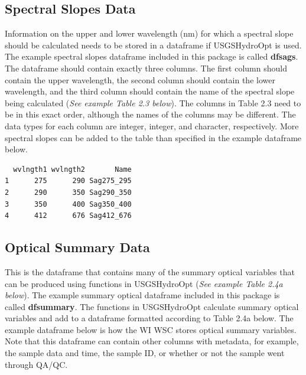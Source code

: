 \documentclass[a4paper,11pt]{article}\usepackage[]{graphicx}\usepackage[]{color}
\makeatletter
\newenvironment{kframe}{%
 \def\at@end@of@kframe{}%
 \ifinner\ifhmode%
  \def\at@end@of@kframe{\end{minipage}}%
  \begin{minipage}{\columnwidth}%
 \fi\fi%
 \def\FrameCommand##1{\hskip\@totalleftmargin \hskip-\fboxsep
 \colorbox{shadecolor}{##1}\hskip-\fboxsep
     \hskip-\linewidth \hskip-\@totalleftmargin \hskip\columnwidth}%
 \MakeFramed {\advance\hsize-\width
   \@totalleftmargin\z@ \linewidth\hsize
   \@setminipage}}%
 {\par\unskip\endMakeFramed%
 \at@end@of@kframe}
\newenvironment{knitrout}{}{} %
\makeatother
\begin{document}
\subsection{Spectral Slopes Data}
Information on the upper and lower wavelength (nm) for which a spectral slope should be calculated needs to be stored in a dataframe if USGSHydroOpt is used. The example spectral slopes dataframe included in this package is called \textbf{dfsags}. The dataframe should contain exactly three columns. The first column should contain the upper wavelength, the second column should contain the lower wavelength, and the third column should contain the name of the spectral slope being calculated (\emph{See example Table 2.3 below}). The columns in Table 2.3 need to be in this exact order, although the names of the columns may be different. The data types for each column are integer, integer, and character, respectively. More spectral slopes can be added to the table than specified in the example dataframe below.

\begin{knitrout}
\color{fgcolor}\begin{kframe}
\begin{verbatim}
  wvlngth1 wvlngth2       Name
1      275      290 Sag275_295
2      290      350 Sag290_350
3      350      400 Sag350_400
4      412      676 Sag412_676
\end{verbatim}
\end{kframe}
\end{knitrout}

\subsection{Optical Summary Data}
This is the dataframe that contains many of the summary optical variables that can be produced using functions in USGSHydroOpt (\emph{See example Table 2.4a below}). The example summary optical dataframe included in this package is called \textbf{dfsummary}. The functions in USGSHydroOpt calculate summary optical variables and add to a dataframe formatted according to Table 2.4a below.  The example dataframe below is how the WI WSC stores optical summary variables. Note that this dataframe can contain other columns with metadata, for example, the sample data and time, the sample ID, or whether or not the sample went through QA/QC.
\end{document}
